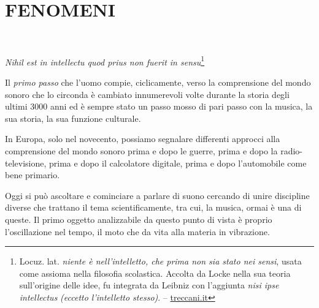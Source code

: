 
\chapter{FENOMENI}
\startcontents[chapters]

~\vfill

\begin{flushright}
		\textit{Nihil est in intellectu quod prius non fuerit in sensu}\footnote{
		Locuz. lat. \emph{niente è nell’intelletto, che prima non sia stato nei sensi},
		usata come assioma nella filosofia scolastica. Accolta da Locke nella
		sua teoria sull’origine delle idee, fu integrata da Leibniz con
		l’aggiunta \emph{nisi ipse intellectus} \emph{(eccetto l’intelletto stesso)}. --
		\url{treccani.it}}
	\end{flushright}

\bigskip

Il \emph{primo passo} che l'uomo compie, ciclicamente, verso la comprensione del
mondo sonoro che lo circonda è cambiato innumerevoli volte durante la storia degli
ultimi 3000 anni ed è sempre stato un passo mosso di pari passo con la musica,
la sua storia, la sua funzione culturale.

In Europa, solo nel novecento, possiamo segnalare differenti approcci alla
comprensione del mondo sonoro prima e dopo le guerre, prima e dopo la radio-televisione,
prima e dopo il calcolatore digitale, prima e dopo l'automobile come bene primario.


Oggi si può ascoltare e cominciare a parlare di suono cercando di unire discipline diverse
che trattano il tema scientificamente, tra cui, la musica, ormai è una di queste.
Il primo oggetto analizzabile da questo punto di vista è proprio l'oscillazione nel tempo,
il moto che da vita alla materia in vibrazione.

\clearpage


